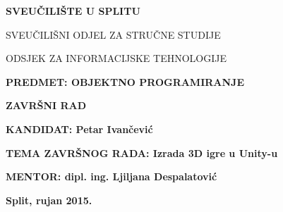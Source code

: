 \begin{center}
\thispagestyle{empty}

\begingroup
    \fontsize{14pt}{12pt}\selectfont\bfseries\center
 	SVEUČILIŠTE U SPLITU \par
	SVEUČILIŠNI ODJEL ZA STRUČNE STUDIJE \par
	ODSJEK ZA INFORMACIJSKE TEHNOLOGIJE
\endgroup\\[4cm]

\end{center}

{ \fontsize{14pt}{12pt}\selectfont\bfseries PREDMET: OBJEKTNO PROGRAMIRANJE}\\[1cm]

\begin{center}
{ \fontsize{16pt}{12pt}\selectfont\bfseries ZAVRŠNI RAD}
\end{center}

{ \fontsize{12pt}{2.5cm}\selectfont\bfseries KANDIDAT: Petar Ivančević}\par
{ \fontsize{12pt}{2.5cm}\selectfont\bfseries TEMA ZAVRŠNOG RADA: Izrada 3D igre u Unity-u}\par
{ \fontsize{12pt}{2.5cm}\selectfont\bfseries MENTOR: dipl. ing. Ljiljana Despalatović}

\begin{center}
\vfill
{ \fontsize{14pt}{12pt}\selectfont\bfseries Split, rujan 2015.}
\end{center}
